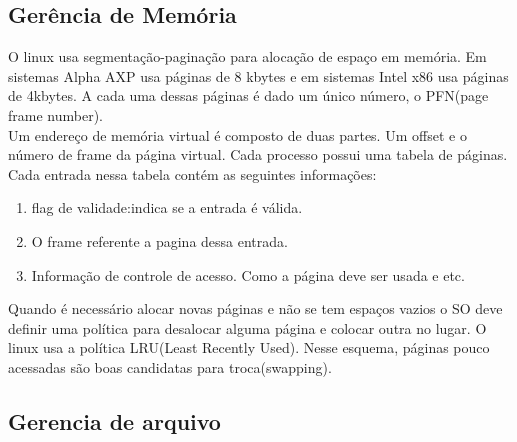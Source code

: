 \documentclass[conference]{IEEEtran}
\begin{document}
\subsection{Gerência de Memória}\label{sec:LinuxMem}
O linux usa segmentação-paginação para alocação de espaço em memória. Em sistemas Alpha AXP usa páginas de 8 kbytes e em sistemas Intel x86 usa páginas de 4kbytes. A cada uma dessas páginas é dado um único número, o PFN(page frame number)\cite{GerenciaMemLinux}.\\

Um endereço de memória virtual é composto de duas partes. Um offset e o número de frame da página virtual. Cada processo possui uma tabela de páginas. Cada entrada nessa tabela contém as seguintes informações:\\
\begin{enumerate}
	\item flag de validade:indica se a entrada é válida.
	\item O frame referente a pagina dessa entrada.
	\item Informação de controle de acesso. Como a página deve ser usada e etc.
\end{enumerate}
\cite{GerenciaMemLinux}

Quando é necessário alocar novas páginas e não se tem espaços vazios o SO deve definir uma política para desalocar alguma página e colocar outra no lugar. O linux usa a política LRU(Least Recently Used). Nesse esquema, páginas pouco acessadas são boas candidatas para troca(swapping)\cite{GerenciaIOLinux}.
\subsection{Gerencia de arquivo}\label{sec:BSDArquivo}
\end{document}
